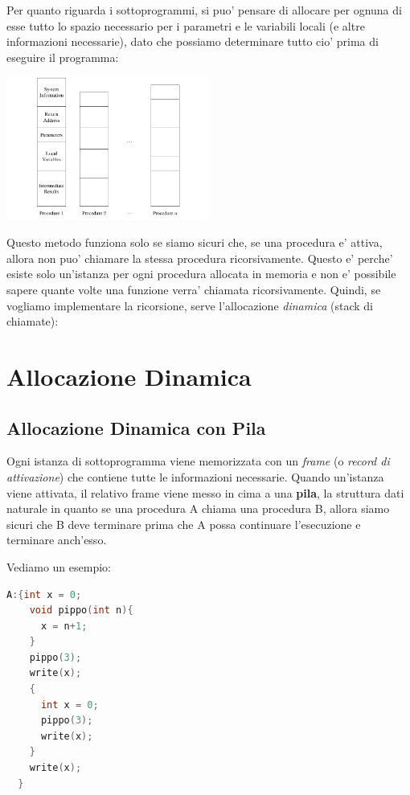 Per quanto riguarda i sottoprogrammi, si puo' pensare di allocare per ognuna di esse tutto lo spazio necessario per i parametri e le variabili locali (e altre informazioni necessarie), dato che possiamo determinare tutto cio' prima di eseguire il programma:
\begin{center}
  \includegraphics[width=0.5\textwidth]{img/2025-03-02-10-46-16.png}
\end{center}

Questo metodo funziona solo se siamo sicuri che, se una procedura e' attiva, allora non puo' chiamare la stessa procedura ricorsivamente. Questo e' perche' esiste solo un'istanza per ogni procedura allocata in memoria e non e' possibile sapere quante volte una funzione verra' chiamata ricorsivamente. Quindi, se vogliamo implementare la ricorsione, serve l'allocazione \textit{dinamica} (stack di chiamate):

\section{Allocazione Dinamica}
\subsection{Allocazione Dinamica con Pila}

Ogni istanza di sottoprogramma viene memorizzata con un \textit{frame} (o \textit{record di attivazione}) che contiene tutte le informazioni necessarie. Quando un'istanza viene attivata, il relativo frame viene messo in cima a una \textbf{pila}, la struttura dati naturale in quanto se una procedura A chiama una procedura B, allora siamo sicuri che B deve terminare prima che A possa continuare l'esecuzione e terminare anch'esso.


Vediamo un esempio:

\begin{lstlisting}[language=C]
  A:{int x = 0;
    void pippo(int n){
      x = n+1;
    }
    pippo(3);
    write(x);
    {
      int x = 0;
      pippo(3);
      write(x);
    }
    write(x);
  }
\end{lstlisting}

